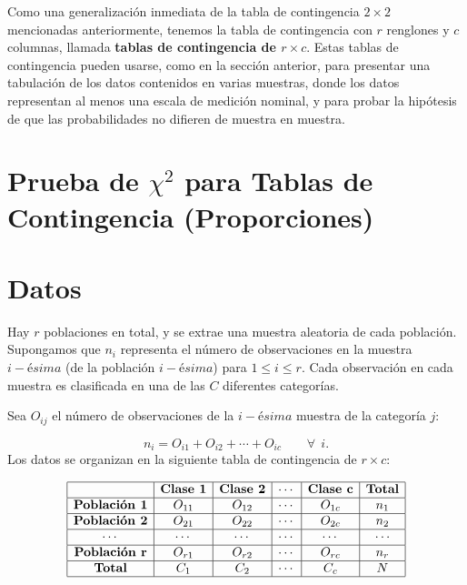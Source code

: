 \documentclass[
  a4paper,
  oneside,
  openany]{book}
\begin{document}
Como una generalización inmediata de la tabla de contingencia \(2 \times 2\) mencionadas anteriormente, tenemos la tabla de contingencia con \(r\) renglones y \(c\) columnas, llamada \textbf{tablas de contingencia de \(r \times c\)}.
Estas tablas de contingencia pueden usarse, como en la sección anterior, para presentar una tabulación de los datos contenidos en varias muestras, donde los datos representan al menos una escala de medición nominal, y para probar la hipótesis de que las probabilidades no difieren de muestra en muestra.

\hypertarget{prueba-de-chi2-para-tablas-de-contingencia-proporciones}{%
\section*{\texorpdfstring{Prueba de \(\chi^2\) para Tablas de Contingencia (Proporciones)}{Prueba de \textbackslash chi\^{}2 para Tablas de Contingencia (Proporciones)}}\label{prueba-de-chi2-para-tablas-de-contingencia-proporciones}}


\hypertarget{datos-12}{%
\section{Datos}\label{datos-12}}

Hay \(r\) poblaciones en total, y se extrae una muestra aleatoria de cada población. Supongamos que \(n_{i}\) representa el número de observaciones en la muestra \(i-ésima\) (de la población \(i-ésima\)) para \(1 \leq i \leq r\). Cada observación en cada muestra es clasificada en una de las \(C\) diferentes categorías.

Sea \(O_{ij}\) el número de observaciones de la \(i-ésima\) muestra de la categoría \(j\):

\[n_{i}= O_{i1}+O_{i2}+\cdots+O_{ic}\ \ \ \ \ \ \ \ \   \forall \ \ i.\]
Los datos se organizan en la siguiente tabla de contingencia de \(r \times c\):

\[
\begin{array}{|c|c|c|c|c|c|}
\hline
 & \textbf{Clase 1}  & \textbf{Clase 2}    & \cdots & \textbf{Clase c} &\textbf{Total}     \\
\hline
\textbf{Población 1} & O_{11} & O_{12} & \cdots & O_{1c} & n_{1}   \\
\hline
\textbf{Población 2} & O_{21} & O_{22} & \cdots & O_{2c} & n_{2}\\
\hline
\cdots    & \cdots & \cdots & \cdots & \cdots & \cdots\\
\hline
\textbf{Población r} &O_{r1} & O_{r2} & \cdots & O_{rc} & n_{r}\\
\hline
\textbf{Total}       & C_{1}  & C_{2}  & \cdots & C_{c}  & N \\
\hline
\end{array}
\]
\end{document}
